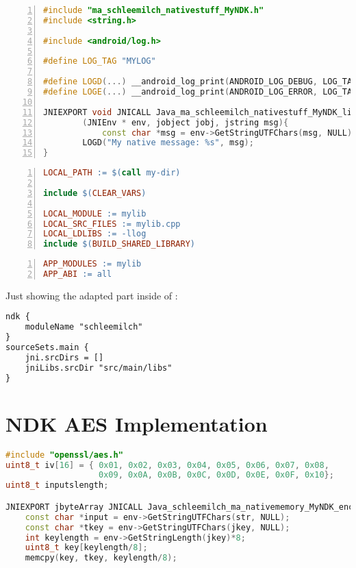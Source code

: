 \begin{appendices}
\begin{lstlisting}[language=C++, caption=mylib.cpp, label=nkd_sample_cpp, numbers=left]
#include "ma_schleemilch_nativestuff_MyNDK.h"
#include <string.h>

#include <android/log.h>

#define LOG_TAG "MYLOG"

#define LOGD(...) __android_log_print(ANDROID_LOG_DEBUG, LOG_TAG, __VA_ARGS__)
#define LOGE(...) __android_log_print(ANDROID_LOG_ERROR, LOG_TAG, __VA_ARGS__)

JNIEXPORT void JNICALL Java_ma_schleemilch_nativestuff_MyNDK_libExe
        (JNIEnv * env, jobject jobj, jstring msg){
        	const char *msg = env->GetStringUTFChars(msg, NULL);
        LOGD("My native message: %s", msg);
}
\end{lstlisting}

\begin{lstlisting}[language=make, caption=Android.mk, label=nkd_sample_make, numbers=left]
LOCAL_PATH := $(call my-dir)

include $(CLEAR_VARS)

LOCAL_MODULE := mylib
LOCAL_SRC_FILES := mylib.cpp
LOCAL_LDLIBS := -llog
include $(BUILD_SHARED_LIBRARY)
\end{lstlisting}

\begin{lstlisting}[language=make, caption=Application.mk, label=nkd_sample_app_make, numbers=left]
APP_MODULES := mylib
APP_ABI := all
\end{lstlisting}

Just showing the adapted part inside of :
\begin{lstlisting}[language=xml, caption=build.gradle, label=nkd_sample_gradle]
ndk {
	moduleName "schleemilch"
}
sourceSets.main {
	jni.srcDirs = []
	jniLibs.srcDir "src/main/libs"
}
\end{lstlisting}


\chapter{NDK AES Implementation}\label{chapter:ndk_aes_implementation}
\begin{lstlisting}[language=C++, caption=AES Encrypt(), label=nkd_aes_encrypt]
#include "openssl/aes.h"
uint8_t iv[16] = { 0x01, 0x02, 0x03, 0x04, 0x05, 0x06, 0x07, 0x08,
                   0x09, 0x0A, 0x0B, 0x0C, 0x0D, 0x0E, 0x0F, 0x10};
uint8_t inputslength;

JNIEXPORT jbyteArray JNICALL Java_schleemilch_ma_nativememory_MyNDK_encrypt (JNIEnv *env, jobject obj, jstring str, jstring jkey){
    const char *input = env->GetStringUTFChars(str, NULL);
    const char *tkey = env->GetStringUTFChars(jkey, NULL);
    int keylength = env->GetStringLength(jkey)*8;
    uint8_t key[keylength/8];
    memcpy(key, tkey, keylength/8);


\end{lstlisting}
\end{appendices}
